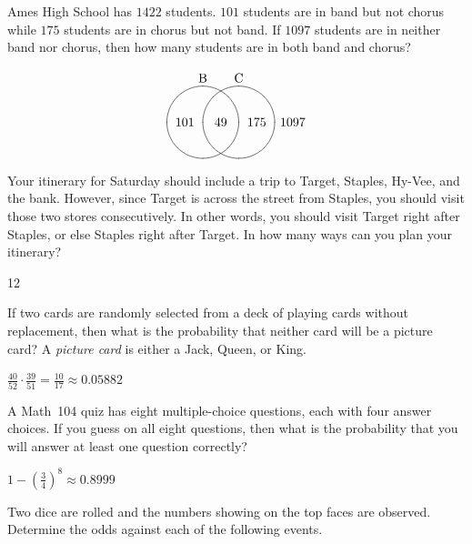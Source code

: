 \documentclass[answers,addpoints,12pt]{exam}
\begin{document}
\begin{questions}

\question[12] Ames High School has $1422$ students.
$101$ students are in band but not chorus while
$175$ students are in chorus but not band.
If $1097$ students are in neither band nor chorus,
then how many students are in both band and chorus?
\begin{solution}
\[\begin{xy}<.5cm,0cm>:
(-1,2)*+!D{\text{B}};
(1,2)*+!D{\text{C}};
(-1,0)*\cir<1cm>{};
(1,0)*\cir<1cm>{};
(0,0)*{49};
(-2,0)*{101};
(2,0)*{175};
(4,0)*{1097};
\end{xy}\]
\end{solution}

\question[15] Your itinerary for Saturday should
include a trip to Target, Staples, Hy-Vee, and the bank.
However, since Target is across the street from Staples,
you should visit those two stores consecutively. In other
words, you should visit Target right after Staples, or else
Staples right after Target. In how many ways
can you plan your itinerary?
\begin{solution}12\end{solution}

\question[10] If two cards are randomly selected from a deck
of playing cards without replacement,
then what is the probability that neither card
will be a picture card? A {\em picture card} is either a Jack, Queen, or King.
\begin{solution}
$\frac{40}{52}\cdot\frac{39}{51}=\frac{10}{17}\approx 0.05882$
\end{solution}

\question[12] A Math~104 quiz has eight multiple-choice
questions, each with four answer choices. If you guess on all
eight questions, then what is the probability that you will answer at
least one question correctly?
\begin{solution}
$1-\left(\frac{3}{4}\right)^8\approx 0.8999$
\end{solution}

\question[16] Two dice are rolled and the
numbers showing on the top faces are observed.
Determine the odds against each of the following events.
\end{questions}
\end{document}
